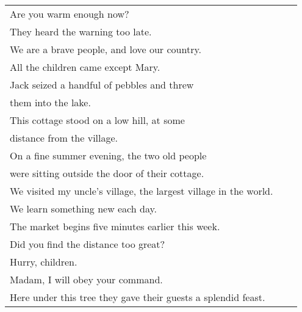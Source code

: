 \begin{tabular}{l|l l}
Are you warm enough now? & &\\
 
They heard the warning too late. & &\\
 
We are a brave people, and love our country. & &\\
 
All the children came except Mary. & &\\
 
Jack seized a handful of pebbles and threw  &\\ \indent  them into the lake. & &\\
 
This cottage stood on a low hill, at some  &\\ \indent  distance from the village. & &\\
 
On a fine summer evening, the two old people  &\\ \indent  were sitting  outside the door of their cottage. & &\\
 
We visited my uncle's village, the largest village in the world. & &\\
 
We learn something new each day. & &\\
 
The market begins five minutes earlier this week. & &\\
 
Did you find the distance too great? & &\\
 
Hurry, children. & &\\
 
Madam, I will obey your command. & &\\
 
Here under this tree they gave their guests a splendid feast. & &\\
 
 
 

\end{tabular}


